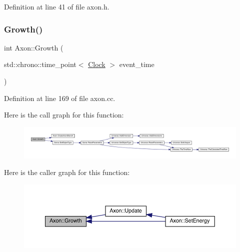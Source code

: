 Definition at line 41 of file axon.\+h.

\mbox{\label{class_axon_a0065c335bc57e0a75962bcbd91f35001}} 
\subsubsection{\texorpdfstring{Growth()}{Growth()}}
{\footnotesize\ttfamily int Axon\+::\+Growth (\begin{DoxyParamCaption}\item[{std\+::chrono\+::time\+\_\+point$<$ \hyperlink{universe_8h_a0ef8d951d1ca5ab3cfaf7ab4c7a6fd80}{Clock} $>$}]{event\+\_\+time }\end{DoxyParamCaption})}



Definition at line 169 of file axon.\+cc.

Here is the call graph for this function\+:
\nopagebreak
\begin{figure}[H]
\begin{center}
\leavevmode
\includegraphics[width=350pt]{class_axon_a0065c335bc57e0a75962bcbd91f35001_cgraph}
\end{center}
\end{figure}
Here is the caller graph for this function\+:
\nopagebreak
\begin{figure}[H]
\begin{center}
\leavevmode
\includegraphics[width=350pt]{class_axon_a0065c335bc57e0a75962bcbd91f35001_icgraph}
\end{center}
\end{figure}
\mbox{\label{class_axon_a7b43ca7f5b696c72ac17a27fea3b2822}} 
